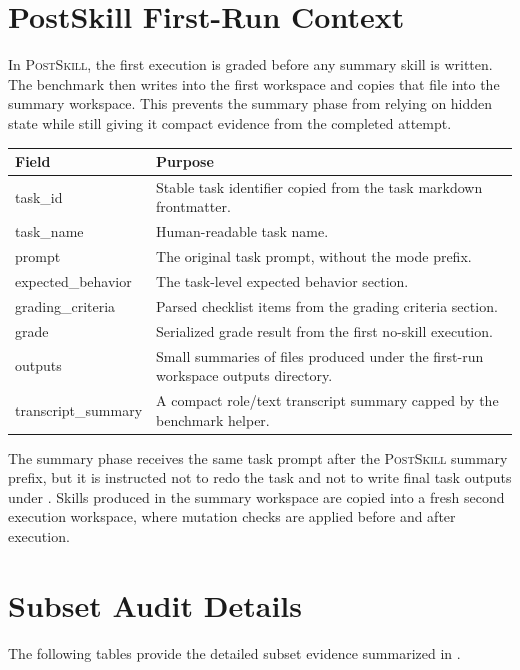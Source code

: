 \documentclass[11pt]{article}
\newcommand{\postskill}{\textsc{PostSkill}}
\begin{document}
\section{PostSkill First-Run Context}
\label{app:first-run-context}
In \postskill{}, the first execution is graded before any summary skill is written. The benchmark then writes  into the first workspace and copies that file into the summary workspace. This prevents the summary phase from relying on hidden state while still giving it compact evidence from the completed attempt.
\begin{center}
\small
{}
\label{tab:first-run-context-fields}
\begin{tabular}{L{0.24\textwidth}L{0.66\textwidth}}
\toprule
\textbf{Field} & \textbf{Purpose} \\
\midrule
task\_id & Stable task identifier copied from the task markdown frontmatter. \\
task\_name & Human-readable task name. \\
prompt & The original task prompt, without the mode prefix. \\
expected\_behavior & The task-level expected behavior section. \\
grading\_criteria & Parsed checklist items from the grading criteria section. \\
grade & Serialized grade result from the first no-skill execution. \\
outputs & Small summaries of files produced under the first-run workspace outputs directory. \\
transcript\_summary & A compact role/text transcript summary capped by the benchmark helper. \\
\bottomrule
\end{tabular}
\end{center}
The summary phase receives the same task prompt after the \postskill{} summary prefix, but it is instructed not to redo the task and not to write final task outputs under . Skills produced in the summary workspace are copied into a fresh second execution workspace, where mutation checks are applied before and after execution.

\section{Subset Audit Details}
\label{app:subset-audits}
The following tables provide the detailed subset evidence summarized in .
\end{document}
